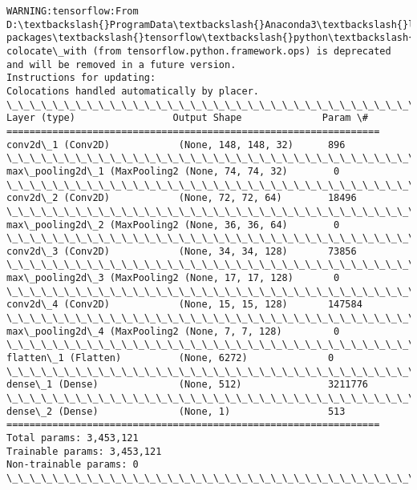\documentclass[11pt]{article}
\begin{document}
    \begin{Verbatim}[commandchars=\\\{\}]
WARNING:tensorflow:From D:\textbackslash{}ProgramData\textbackslash{}Anaconda3\textbackslash{}lib\textbackslash{}site-packages\textbackslash{}tensorflow\textbackslash{}python\textbackslash{}framework\textbackslash{}op\_def\_library.py:263: colocate\_with (from tensorflow.python.framework.ops) is deprecated and will be removed in a future version.
Instructions for updating:
Colocations handled automatically by placer.
\_\_\_\_\_\_\_\_\_\_\_\_\_\_\_\_\_\_\_\_\_\_\_\_\_\_\_\_\_\_\_\_\_\_\_\_\_\_\_\_\_\_\_\_\_\_\_\_\_\_\_\_\_\_\_\_\_\_\_\_\_\_\_\_\_
Layer (type)                 Output Shape              Param \#   
=================================================================
conv2d\_1 (Conv2D)            (None, 148, 148, 32)      896       
\_\_\_\_\_\_\_\_\_\_\_\_\_\_\_\_\_\_\_\_\_\_\_\_\_\_\_\_\_\_\_\_\_\_\_\_\_\_\_\_\_\_\_\_\_\_\_\_\_\_\_\_\_\_\_\_\_\_\_\_\_\_\_\_\_
max\_pooling2d\_1 (MaxPooling2 (None, 74, 74, 32)        0         
\_\_\_\_\_\_\_\_\_\_\_\_\_\_\_\_\_\_\_\_\_\_\_\_\_\_\_\_\_\_\_\_\_\_\_\_\_\_\_\_\_\_\_\_\_\_\_\_\_\_\_\_\_\_\_\_\_\_\_\_\_\_\_\_\_
conv2d\_2 (Conv2D)            (None, 72, 72, 64)        18496     
\_\_\_\_\_\_\_\_\_\_\_\_\_\_\_\_\_\_\_\_\_\_\_\_\_\_\_\_\_\_\_\_\_\_\_\_\_\_\_\_\_\_\_\_\_\_\_\_\_\_\_\_\_\_\_\_\_\_\_\_\_\_\_\_\_
max\_pooling2d\_2 (MaxPooling2 (None, 36, 36, 64)        0         
\_\_\_\_\_\_\_\_\_\_\_\_\_\_\_\_\_\_\_\_\_\_\_\_\_\_\_\_\_\_\_\_\_\_\_\_\_\_\_\_\_\_\_\_\_\_\_\_\_\_\_\_\_\_\_\_\_\_\_\_\_\_\_\_\_
conv2d\_3 (Conv2D)            (None, 34, 34, 128)       73856     
\_\_\_\_\_\_\_\_\_\_\_\_\_\_\_\_\_\_\_\_\_\_\_\_\_\_\_\_\_\_\_\_\_\_\_\_\_\_\_\_\_\_\_\_\_\_\_\_\_\_\_\_\_\_\_\_\_\_\_\_\_\_\_\_\_
max\_pooling2d\_3 (MaxPooling2 (None, 17, 17, 128)       0         
\_\_\_\_\_\_\_\_\_\_\_\_\_\_\_\_\_\_\_\_\_\_\_\_\_\_\_\_\_\_\_\_\_\_\_\_\_\_\_\_\_\_\_\_\_\_\_\_\_\_\_\_\_\_\_\_\_\_\_\_\_\_\_\_\_
conv2d\_4 (Conv2D)            (None, 15, 15, 128)       147584    
\_\_\_\_\_\_\_\_\_\_\_\_\_\_\_\_\_\_\_\_\_\_\_\_\_\_\_\_\_\_\_\_\_\_\_\_\_\_\_\_\_\_\_\_\_\_\_\_\_\_\_\_\_\_\_\_\_\_\_\_\_\_\_\_\_
max\_pooling2d\_4 (MaxPooling2 (None, 7, 7, 128)         0         
\_\_\_\_\_\_\_\_\_\_\_\_\_\_\_\_\_\_\_\_\_\_\_\_\_\_\_\_\_\_\_\_\_\_\_\_\_\_\_\_\_\_\_\_\_\_\_\_\_\_\_\_\_\_\_\_\_\_\_\_\_\_\_\_\_
flatten\_1 (Flatten)          (None, 6272)              0         
\_\_\_\_\_\_\_\_\_\_\_\_\_\_\_\_\_\_\_\_\_\_\_\_\_\_\_\_\_\_\_\_\_\_\_\_\_\_\_\_\_\_\_\_\_\_\_\_\_\_\_\_\_\_\_\_\_\_\_\_\_\_\_\_\_
dense\_1 (Dense)              (None, 512)               3211776   
\_\_\_\_\_\_\_\_\_\_\_\_\_\_\_\_\_\_\_\_\_\_\_\_\_\_\_\_\_\_\_\_\_\_\_\_\_\_\_\_\_\_\_\_\_\_\_\_\_\_\_\_\_\_\_\_\_\_\_\_\_\_\_\_\_
dense\_2 (Dense)              (None, 1)                 513       
=================================================================
Total params: 3,453,121
Trainable params: 3,453,121
Non-trainable params: 0
\_\_\_\_\_\_\_\_\_\_\_\_\_\_\_\_\_\_\_\_\_\_\_\_\_\_\_\_\_\_\_\_\_\_\_\_\_\_\_\_\_\_\_\_\_\_\_\_\_\_\_\_\_\_\_\_\_\_\_\_\_\_\_\_\_

    \end{Verbatim}
\end{document}
